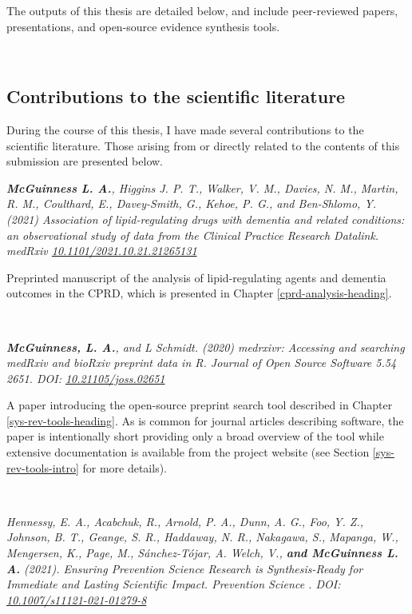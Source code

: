 \documentclass[a4paper, twoside]{templates/ociamthesis}
\begin{document}
The outputs of this thesis are detailed below, and include peer-reviewed papers, presentations, and open-source evidence synthesis tools.

~

\hypertarget{contributions-to-the-scientific-literature}{%
\subsection{Contributions to the scientific literature}\label{contributions-to-the-scientific-literature}}

During the course of this thesis, I have made several contributions to the scientific literature. Those arising from or directly related to the contents of this submission are presented below.

\emph{\textbf{McGuinness L. A.}, Higgins J. P. T., Walker, V. M., Davies, N. M., Martin, R. M., Coulthard, E., Davey-Smith, G., Kehoe, P. G., and Ben-Shlomo, Y. (2021) Association of lipid-regulating drugs with dementia and related conditions: an observational study of data from the Clinical Practice Research Datalink. medRxiv \href{https://doi.org/10.1101/2021.10.21.21265131}{10.1101/2021.10.21.21265131}}

Preprinted manuscript of the analysis of lipid-regulating agents and dementia outcomes in the CPRD, which is presented in Chapter \ref{cprd-analysis-heading}.

~

\emph{\textbf{McGuinness, L. A.}, and L Schmidt. (2020) medrxivr: Accessing and searching medRxiv and bioRxiv preprint data in R. Journal of Open Source Software 5.54 2651. DOI: \href{https://doi.org/10.21105/joss.02651}{10.21105/joss.02651}}

A paper introducing the open-source preprint search tool described in Chapter \ref{sys-rev-tools-heading}. As is common for journal articles describing software, the paper is intentionally short providing only a broad overview of the tool while extensive documentation is available from the project website (see Section \ref{sys-rev-tools-intro} for more details).

~

\emph{Hennessy, E. A., Acabchuk, R., Arnold, P. A., Dunn, A. G., Foo, Y. Z., Johnson, B. T., Geange, S. R., Haddaway, N. R., Nakagawa, S., Mapanga, W., Mengersen, K., Page, M., Sánchez-Tójar, A. Welch, V., \textbf{and McGuinness L. A.} (2021). Ensuring Prevention Science Research is Synthesis-Ready for Immediate and Lasting Scientific Impact. Prevention Science . DOI: \href{https://doi.org/10.1007/s11121-021-01279-8}{10.1007/s11121-021-01279-8}}
\end{document}
